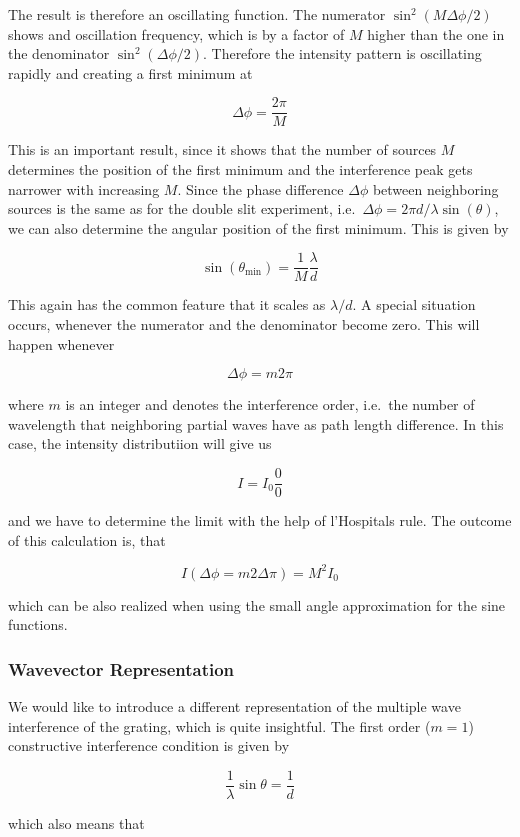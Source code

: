 \documentclass[
  a4paper,
]{book}
\begin{document}
The result is therefore an oscillating function. The numerator
\(\sin^2(M\Delta \phi/2)\) shows and oscillation frequency, which is by
a factor of \(M\) higher than the one in the denominator
\(\sin^2 (\Delta \phi/2)\). Therefore the intensity pattern is
oscillating rapidly and creating a first minimum at

\[
\Delta \phi=\frac{2\pi}{M}
\]

This is an important result, since it shows that the number of sources
\(M\) determines the position of the first minimum and the interference
peak gets narrower with increasing \(M\). Since the phase difference
\(\Delta \phi\) between neighboring sources is the same as for the
double slit experiment,
i.e.~\(\Delta \phi=2\pi d/\lambda \sin(\theta)\), we can also determine
the angular position of the first minimum. This is given by

\[
\sin(\theta_\textrm{min})=\frac{1}{M}\frac{\lambda}{d}
\]

This again has the common feature that it scales as \(\lambda/d\). A
special situation occurs, whenever the numerator and the denominator
become zero. This will happen whenever

\[
\Delta \phi=m 2\pi
\]

where \(m\) is an integer and denotes the interference order, i.e.~the
number of wavelength that neighboring partial waves have as path length
difference. In this case, the intensity distributiion will give us

\[
I=I_0 \frac{0}{0}
\]

and we have to determine the limit with the help of l'Hospitals rule.
The outcome of this calculation is, that

\[
I(\Delta \phi=m2\Delta \pi)=M^2 I_0
\]

which can be also realized when using the small angle approximation for
the sine functions.

\subsubsection{Wavevector
Representation}\label{wavevector-representation}

We would like to introduce a different representation of the multiple
wave interference of the grating, which is quite insightful. The first
order (\(m=1\)) constructive interference condition is given by

\[
\frac{1}{\lambda}\sin{\theta}= \frac{1}{d}
\]

which also means that
\end{document}
